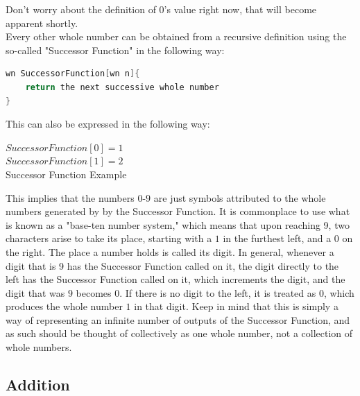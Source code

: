 Don't worry about the definition of $0$'s value right now, that will become apparent shortly. \\
Every other whole number can be obtained from a recursive definition using the so-called "Successor Function" in the following way:
\begin{center}
\begin{lstlisting}[language=C, caption=Successor Function,label=lst:sucFunc]
wn SuccessorFunction[wn n]{
	return the next successive whole number
}
\end{lstlisting}
\end{center} 
This can also be expressed in the following way:
\begin{center}
$SuccessorFunction[0] = 1$\\
$SuccessorFunction[1] = 2$\\
Successor Function Example\label{eq:sucFuncEx}
\end{center}
This implies that the numbers $0$-$9$ are just symbols attributed to the whole numbers generated by by the Successor Function. It is commonplace to use what is known as a "base-ten number system," which means that upon reaching 9, two characters arise to take its place, starting with a $1$ in the furthest left, and a $0$ on the right. The place a number holds is called its digit. In general, whenever a digit that is 9 has the Successor Function called on it, the digit directly to the left has the Successor Function called on it, which increments the digit, and the digit that was $9$ becomes $0$. If there is no digit to the left, it is treated as $0$, which produces the whole number $1$ in that digit. Keep in mind that this is simply a way of representing an infinite number of outputs of the Successor Function, and as such should be thought of collectively as one whole number, not a collection of whole numbers. \\


\subsection{Addition}

